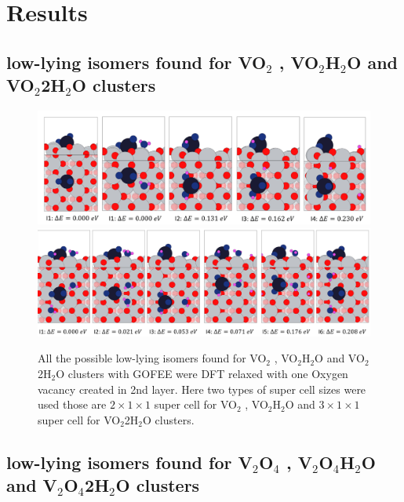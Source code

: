 \documentclass[aip,amsmath,amssymb,reprint, jcp]{revtex4-1}
\begin{document}
\section{Results}
\subsection{low-lying isomers found for VO$_2$ , VO$_2$H$_2$O and VO$_2$2H$_2$O clusters}
\begin{figure}
\centering
\includegraphics[width=1.0\textwidth]{VO2_VO2H2Oclusters_TiO2_101sur_2by1supercell.png}
\includegraphics[width=1.0\textwidth]{VO2_2H2Oclusters_TiO2_101sur_3by1supercell.png}
\caption{All the possible low-lying isomers found for VO$_2$ , VO$_2$H$_2$O and VO$_2$2H$_2$O clusters with GOFEE were DFT relaxed with one Oxygen vacancy created in 2nd layer. Here two types of super cell sizes were used those are $2 \times 1 \times 1$ super cell for VO$_2$ , VO$_2$H$_2$O and  $3 \times 1 \times 1$ super cell for VO$_2$2H$_2$O clusters.}
\label{fig:exptobser}
\end{figure}

\subsection{low-lying isomers found for V$_2$O$_4$ , V$_2$O$_4$H$_2$O and V$_2$O$_4$2H$_2$O clusters}
\end{document}
